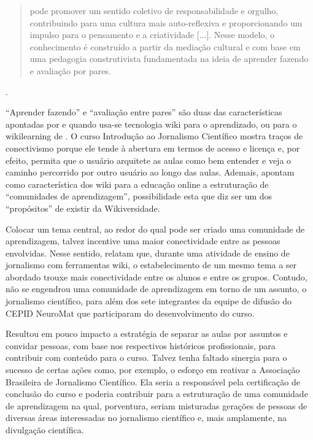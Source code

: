 \documentclass{textolivre}
\begin{document}
\begin{quote}
pode promover um sentido coletivo de responsabilidade e orgulho, contribuindo para uma cultura mais auto-reflexiva e proporcionando um impulso para o pensamento e a criatividade [...]. Nesse modelo, o conhecimento é construído a partir da mediação cultural e com base em uma pedagogia construtivista fundamentada na ideia de aprender fazendo e  avaliação por pares.
\end{quote}.
	
“Aprender fazendo” e “avaliação entre pares” são duas das características apontadas por \textcite{lawler2008} e \textcite{lai2009} quando usa-se tecnologia wiki para o aprendizado, ou para o wikilearning de \textcite{suoranta2015}. O curso Introdução ao Jornalismo Científico mostra traços de conectivismo porque ele tende à abertura em termos de acesso e licença e, por efeito, permita que o usuário arquitete as aulas como bem entender e veja o caminho percorrido por outro usuário ao longo das aulas. Ademais, \textcite{junior2017} apontam como característica dos wiki para a educação online a estruturação de “comunidades de aprendizagem”, possibilidade esta que \textcite{lawler2008} diz ser um dos “propósitos” de existir da Wikiversidade. 

Colocar um tema central, ao redor do qual pode ser criado uma comunidade de aprendizagem, talvez incentive uma maior conectividade entre as pessoas envolvidas. Nesse sentido, \textcite[p. 180]{gomes2011} relatam que, durante uma atividade de ensino de jornalismo com ferramentas wiki, o estabelecimento de um mesmo tema a ser abordado trouxe mais conectividade entre os alunos e entre os grupos. Contudo, não se engendrou uma comunidade de aprendizagem em torno de um assunto, o jornalismo científico, para além dos sete integrantes da equipe de difusão do CEPID NeuroMat que participaram do desenvolvimento do curso. 

Resultou em pouco impacto a estratégia de separar as aulas por assuntos e convidar pessoas, com base nos respectivos históricos profissionais, para contribuir com conteúdo para o curso. Talvez tenha faltado sinergia para o sucesso de certas ações como, por exemplo, o esforço em reativar a Associação Brasileira de Jornalismo Científico. Ela seria a responsável pela certificação de conclusão do curso e poderia contribuir para a estruturação de uma comunidade de aprendizagem na qual, porventura, seriam misturadas gerações de pessoas de diversas áreas interessadas no jornalismo científico e, mais amplamente, na divulgação científica.
\end{document}
